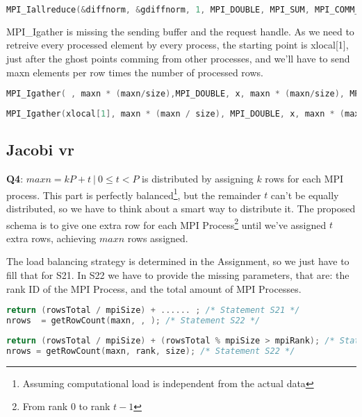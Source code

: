 \documentclass[a4paper, 10pt]{article}
\begin{document}
    \begin{lstlisting}[language=c, caption={Correct S19}]
MPI_Iallreduce(&diffnorm, &gdiffnorm, 1, MPI_DOUBLE, MPI_SUM, MPI_COMM_WORLD, &r[0]); /* S19 */
    \end{lstlisting}

MPI\_Igather is missing the sending buffer and the request handle. As we need to retreive every processed element by every process, the starting point is xlocal[1], just after the ghost points comming from other processes, and we'll have to send maxn elements per row times the number of processed rows.
    \begin{lstlisting}[language=c, caption={Template 20}]
MPI_Igather( , maxn * (maxn/size),MPI_DOUBLE, x, maxn * (maxn/size), MPI_DOUBLE, 0, MPI_COMM_WORLD, &r[ ]); /* S20 */
    \end{lstlisting}

    \begin{lstlisting}[language=c, caption={Correct 20}]
MPI_Igather(xlocal[1], maxn * (maxn / size), MPI_DOUBLE, x, maxn * (maxn / size), MPI_DOUBLE, 0, MPI_COMM_WORLD, &r[0]); /* S20 */
    \end{lstlisting}


\subsection{Jacobi vr}

\textbf{Q4}: $maxn = kP + t \ | \ 0 \leq t < P$ is distributed by assigning $k$ rows for each MPI process. This part is perfectly balanced\footnote{Assuming computational load is independent from the actual data}, but the remainder $t$ can't be equally distributed, so we have to think about a smart way to distribute it. The proposed schema is to give one extra row for each MPI Process\footnote{From rank 0 to rank $t - 1$} until we've assigned $t$ extra rows, achieving $maxn$ rows assigned.

The load balancing strategy is determined in the Assignment, so we just have to fill that for S21. In S22 we have to provide the missing parameters, that are: the rank ID of the MPI Process, and the total amount of MPI Processes.
    \begin{lstlisting}[language=c, caption={Template S21, S22}]
return (rowsTotal / mpiSize) + ...... ; /* Statement S21 */
nrows  = getRowCount(maxn, , ); /* Statement S22 */
    \end{lstlisting}

    \begin{lstlisting}[language=c, caption={Correct S21, S22}]
return (rowsTotal / mpiSize) + (rowsTotal % mpiSize > mpiRank); /* Statement S21 */
nrows = getRowCount(maxn, rank, size); /* Statement S22 */
    \end{lstlisting}
\end{document}
